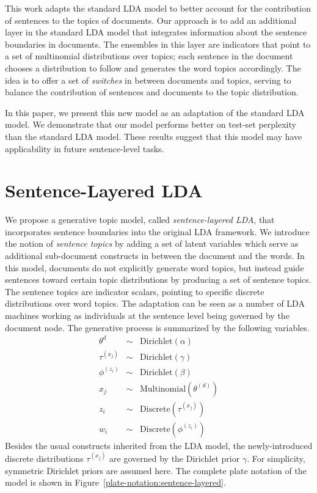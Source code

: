 This work adapts the standard LDA model to better account for the contribution
of sentences to the topics of documents.  Our approach is to add an additional
layer in the standard LDA model that integrates information about the sentence
boundaries in documents.  The ensembles in this layer are indicators that point
to a set of multinomial distributions over topics; each sentence in the
document chooses a distribution to follow and generates the word topics
accordingly.  The idea is to offer a set of \emph{switches} in between
documents and topics, serving to balance the contribution of sentences and
documents to the topic distribution.  

In this paper, we present this new model as an adaptation of the standard
LDA model.  We demonstrate that our model performs better on test-set
perplexity than the standard LDA model.  These results suggest that this model
may have applicability in future sentence-level tasks.

\section{Sentence-Layered LDA} \label{s:sentence-layered-lda} 

We propose a generative topic model, called {\it sentence-layered LDA}, that
incorporates sentence boundaries into the original LDA framework.  We introduce
the notion of {\it sentence topics} by adding a set of latent variables which
serve as additional sub-document constructs in between the document and the
words.  In this model, documents do not explicitly generate word topics, but
instead guide sentences toward certain topic distributions by producing a set
of sentence topics.  The sentence topics are indicator scalars, pointing to
specific discrete distributions over word topics.  The adaptation can be seen as
a number of LDA machines working as individuals at the sentence level being
governed by the document node.  The generative process is summarized by the
following variables.  
\begin{eqnarray*}
  \theta^{d} &\sim& \mathrm{Dirichlet}(\alpha) \\
  \tau^{(x_j)} &\sim& \mathrm{Dirichlet}(\gamma) \\
  \phi^{(z_i)} &\sim& \mathrm{Dirichlet}(\beta) \\
  x_j &\sim& \mathrm{Multinomial}(\theta^{(d)}) \\
  z_i &\sim& \mathrm{Discrete}(\tau^{(x_j)}) \\
  w_i &\sim& \mathrm{Discrete}(\phi^{(z_i)})
\end{eqnarray*}
Besides the usual constructs inherited from the LDA model, the newly-introduced
discrete distributions $\tau^{(x_j)}$ are governed by the Dirichlet prior
$\gamma$.   For simplicity, symmetric Dirichlet priors are assumed here.  The
complete plate notation of the model is shown in
Figure~\ref{plate-notation:sentence-layered}.

